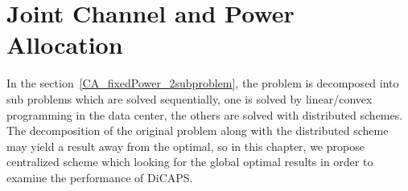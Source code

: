 



\section{Joint Channel and Power Allocation}
In the section~\ref{CA_fixedPower_2subproblem}, the problem is decomposed into sub problems which are solved sequentially, one is solved by linear/convex programming in the data center, the others are solved with distributed schemes.
The decomposition of the original problem along with the distributed scheme may yield a result away from the optimal, so in this chapter, we propose centralized scheme which looking for the global optimal results in order to examine the performance of DiCAPS.



